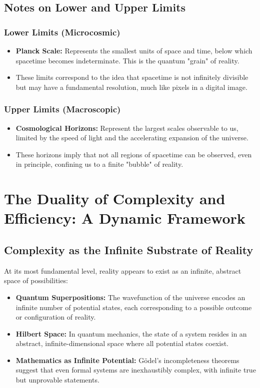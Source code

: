 \documentclass[12pt]{article}
\begin{document}
\subsection{Notes on Lower and Upper Limits}

\subsubsection{Lower Limits (Microcosmic)}

\begin{itemize}
    \item \textbf{Planck Scale:} Represents the smallest units of space and time, below which spacetime becomes indeterminate. This is the quantum "grain" of reality.
    \item These limits correspond to the idea that spacetime is not infinitely divisible but may have a fundamental resolution, much like pixels in a digital image.
\end{itemize}

\subsubsection{Upper Limits (Macroscopic)}

\begin{itemize}
    \item \textbf{Cosmological Horizons:} Represent the largest scales observable to us, limited by the speed of light and the accelerating expansion of the universe.
    \item These horizons imply that not all regions of spacetime can be observed, even in principle, confining us to a finite "bubble" of reality.
\end{itemize}


\section{The Duality of Complexity and Efficiency: A Dynamic Framework}

\subsection{Complexity as the Infinite Substrate of Reality}

At its most fundamental level, reality appears to exist as an infinite, abstract space of possibilities:
\begin{itemize}
    \item \textbf{Quantum Superpositions:} The wavefunction of the universe encodes an infinite number of potential states, each corresponding to a possible outcome or configuration of reality.
    \item \textbf{Hilbert Space:} In quantum mechanics, the state of a system resides in an abstract, infinite-dimensional space where all potential states coexist.
    \item \textbf{Mathematics as Infinite Potential:} Gödel's incompleteness theorems suggest that even formal systems are inexhaustibly complex, with infinite true but unprovable statements.
\end{itemize}
\end{document}
